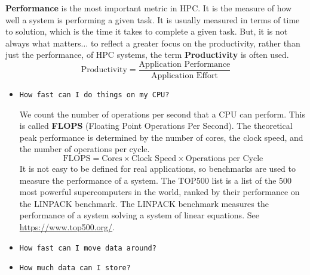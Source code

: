\textbf{Performance} is the most important metric in HPC. It is the measure of how well a system is performing a given task. It is usually measured in terms of time to solution, which is the time it takes to complete a given task. But, it is not always what matters$\dots$ to reflect a greater focus on the productivity, rather than just the performance, of HPC systems, the term \textbf{Productivity} is often used.
\[
    \text{Productivity} = \frac{\text{Application Performance}}{\text{Application Effort}}
\]

\begin{itemize}
    \item \texttt{How fast can I do things on my CPU?}
    
    We count the number of operations per second that a CPU can perform. This is called \textbf{FLOPS} (Floating Point Operations Per Second). The theoretical peak performance is determined by the number of cores, the clock speed, and the number of operations per cycle.
    \[
        \text{FLOPS} = \text{Cores} \times \text{Clock Speed} \times \text{Operations per Cycle}
    \]
    It is not easy to be defined for real applications, so benchmarks are used to measure the performance of a system. The TOP500 list is a list of the 500 most powerful supercomputers in the world, ranked by their performance on the LINPACK benchmark. The LINPACK benchmark measures the performance of a system solving a system of linear equations. See \url{https://www.top500.org/}.
    \item \texttt{How fast can I move data around?}
    

    \item \texttt{How much data can I store?}
    

\end{itemize}


